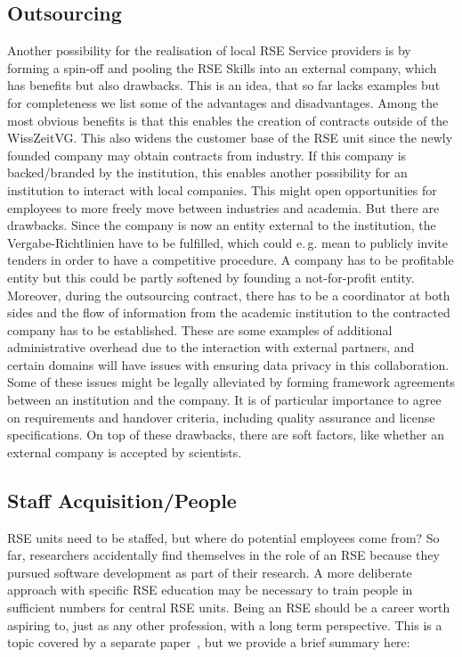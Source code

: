 \documentclass[a4paper]{article}
\makeatletter
\newcommand*{\eg}{e.\,g.\@\xspace}
\makeatother
\begin{document}
\subsection{Outsourcing}

Another possibility for the realisation of local RSE Service providers is by forming a spin-off and pooling the RSE Skills into an external company, which has benefits but also drawbacks.
This is an idea, that so far lacks examples but for completeness we list some of the advantages and disadvantages.
Among the most obvious benefits is that this enables the creation of contracts outside of the WissZeitVG.\@
This also widens the customer base of the RSE unit since the newly founded company may obtain contracts from industry.
If this company is backed/branded by the institution, this enables another possibility for an institution to interact with local companies.
This might open opportunities for employees to more freely move between industries and academia.
But there are drawbacks.
Since the company is now an entity external to the institution, the Vergabe-Richtlinien have to be fulfilled, which could \eg{} mean to publicly invite tenders in order to have a competitive procedure.
A company has to be profitable entity but this could be partly softened by founding a not-for-profit entity.
Moreover, during the outsourcing contract, there has to be a coordinator at both sides and the flow of information from the academic institution to the contracted company has to be established.
These are some examples of additional administrative overhead due to the interaction with external partners, and
certain domains will have issues with ensuring data privacy in this collaboration.
Some of these issues might be legally alleviated by forming framework agreements between an institution and the company.
It is of particular importance to agree on requirements and handover criteria, including quality assurance and license specifications.
On top of these drawbacks, there are soft factors, like whether an external company is accepted by scientists.

\subsection{Staff Acquisition/People}

RSE units need to be staffed, but where do potential employees come from?
So far, researchers accidentally find themselves in the role of an RSE because they pursued software development as part of their research.
A more deliberate approach with specific RSE education may be necessary to train people in sufficient numbers for central RSE units.
Being an RSE should be a career worth aspiring to, just as any other profession, with a long term perspective.
This is a topic covered by a separate paper~\autocite{goth_foundational_competencies_2024}, but we provide a brief summary here:
\end{document}
